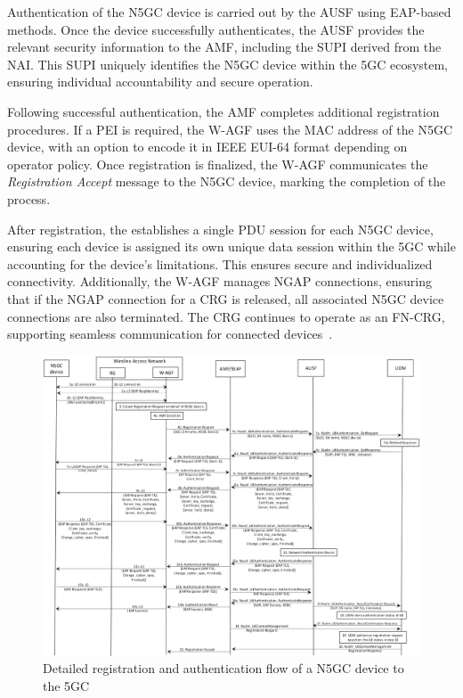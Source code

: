 Authentication of the \ac{N5GC} device is carried out by the \ac{AUSF} using \ac{EAP}-based methods. Once the device successfully authenticates, the \ac{AUSF} provides the relevant security information to the \ac{AMF}, including the \ac{SUPI} derived from the \ac{NAI}. This \ac{SUPI} uniquely identifies the \ac{N5GC} device within the \ac{5GC} ecosystem, ensuring individual accountability and secure operation.

Following successful authentication, the \ac{AMF} completes additional registration procedures. If a \ac{PEI} is required, the \ac{W-AGF} uses the \ac{MAC} address of the \ac{N5GC} device, with an option to encode it in IEEE \ac{EUI-64} format depending on operator policy. Once registration is finalized, the \ac{W-AGF} communicates the \textit{Registration Accept} message to the \ac{N5GC} device, marking the completion of the process.

After registration, the  establishes a single \ac{PDU} session for each \ac{N5GC} device, ensuring each device is assigned its own unique data session within the \ac{5GC} while accounting for the device's limitations. This ensures secure and individualized connectivity. Additionally, the \ac{W-AGF} manages \ac{NGAP} connections, ensuring that if the \ac{NGAP} connection for a \ac{CRG} is released, all associated \ac{N5GC} device connections are also terminated. The \ac{CRG} continues to operate as an \ac{FN-CRG}, supporting seamless communication for connected devices~\cite{23.316-p25}.

\begin{figure}
    \centering
    \includegraphics[width=0.75\linewidth]{figs/Detailed registration and authentication flow of a non-5G capable device to the 5GC.png}
    \caption{Detailed registration and authentication flow of a \ac{N5GC} device to the \ac{5GC}}
    \label{fig:Detailed registration and authentication flow of a non-5G capable device to the 5GC}
\end{figure}

